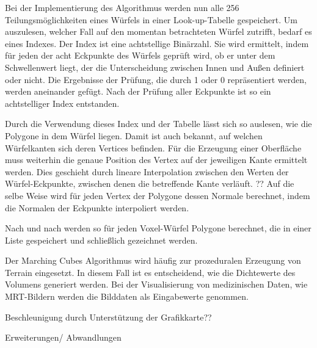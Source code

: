 Bei der Implementierung des Algorithmus werden nun alle 256 Teilungsmöglichkeiten eines Würfels in einer Look-up-Tabelle gespeichert. Um auszulesen, welcher Fall auf den momentan betrachteten Würfel zutrifft, bedarf es eines Indexes. 
Der Index ist eine achtstellige Binärzahl. Sie wird ermittelt, indem für jeden der acht Eckpunkte des Würfels geprüft wird, ob er unter dem Schwellenwert liegt, der die Unterscheidung zwischen Innen und Außen definiert oder nicht. Die Ergebnisse der Prüfung, die durch 1 oder 0 repräsentiert werden, werden aneinander gefügt. Nach der Prüfung aller Eckpunkte ist so ein achtstelliger Index entstanden. 

Durch die Verwendung dieses Index und der Tabelle lässt sich so auslesen, wie die Polygone in dem Würfel liegen. Damit ist auch bekannt, auf welchen Würfelkanten sich deren Vertices befinden. Für die Erzeugung einer Oberfläche muss weiterhin die genaue Position des Vertex auf der jeweiligen Kante ermittelt werden. Dies geschieht durch lineare Interpolation zwischen den Werten der Würfel-Eckpunkte, zwischen denen die betreffende Kante verläuft. ??
Auf die selbe Weise wird für jeden Vertex der Polygone dessen Normale berechnet, indem die Normalen der Eckpunkte interpoliert werden.

Nach und nach werden so für jeden Voxel-Würfel Polygone berechnet, die in einer Liste gespeichert und schließlich gezeichnet werden.

Der Marching Cubes Algorithmus wird häufig zur prozeduralen Erzeugung von Terrain eingesetzt. In diesem Fall ist es entscheidend, wie die Dichtewerte des Volumens generiert werden. Bei der Visualisierung von medizinischen Daten, wie MRT-Bildern werden die Bilddaten als Eingabewerte genommen.

\citet{Lorensen87}

Beschleunigung durch Unterstützung der Grafikkarte??

Erweiterungen/ Abwandlungen


